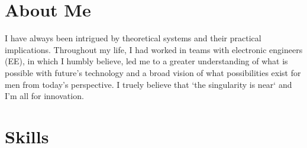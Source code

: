 \documentclass[11pt,a4paper,helvet]{moderncv}
\begin{document}

\newpage

\section{About Me}
I have always been intrigued by theoretical systems and their practical implications. Throughout my life, I had worked in teams with electronic engineers (EE), in which I humbly believe, led me to a greater understanding of what is possible with future's technology and a broad vision of what possibilities exist for men from today's perspective. I truely believe that `the singularity is near` and I'm all for innovation.


\section{Skills}
\end{document}
